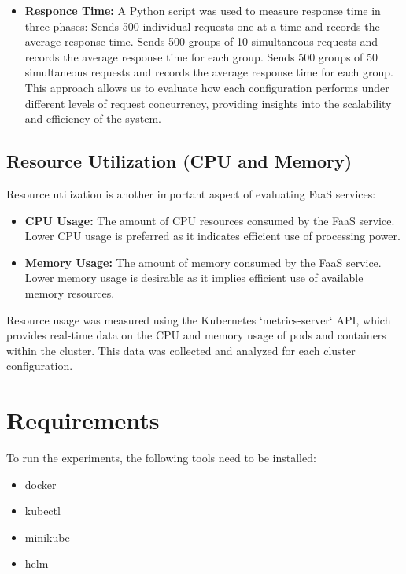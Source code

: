 \documentclass{article}
\begin{document}
\begin{itemize}
    \item \textbf{Responce Time:} A Python script was used to measure response time in three phases:
        Sends 500 individual requests one at a time and records the average response time.
        Sends 500 groups of 10 simultaneous requests and records the average response time for each group.
        Sends 500 groups of 50 simultaneous requests and records the average response time for each group.
This approach allows us to evaluate how each configuration performs under different levels of request concurrency, providing insights into the scalability and efficiency of the system.
 
\end{itemize}


\subsection{Resource Utilization (CPU and Memory)}
Resource utilization is another important aspect of evaluating FaaS services:

\begin{itemize}
    \item \textbf{CPU Usage:} The amount of CPU resources consumed by the FaaS service. Lower CPU usage is preferred as it indicates efficient use of processing power.
    \item \textbf{Memory Usage:} The amount of memory consumed by the FaaS service. Lower memory usage is desirable as it implies efficient use of available memory resources.
\end{itemize}

Resource usage was measured using the Kubernetes `metrics-server` API, which provides real-time data on the CPU and memory usage of pods and containers within the cluster. This data was collected and analyzed for each cluster configuration.
\newpage


\section{Requirements}
To run the experiments, the following tools need to be installed:

\begin{itemize}
   \item docker
   \item kubectl
   \item minikube
   \item helm
\end{itemize}
\end{document}
